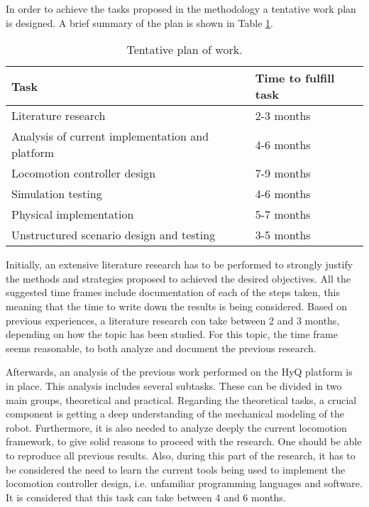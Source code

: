 \documentclass[main.tex]{subfiles}
\begin{document}
	In order to achieve the tasks proposed in the methodology a tentative work plan is designed. A brief summary of the plan is shown in Table \ref{tab:Planning}.
	
	\begin{table}[H]
		\caption{Tentative plan of work.}
		\centering
		\begin{tabular}{|l|l|}
			\hline
			Task &Time to fulfill task\\ \hline
			Literature research & 2-3 months\\ 
			Analysis of current implementation and platform  & 4-6 months\\ 
			Locomotion controller design & 7-9 months\\ 
			Simulation testing & 4-6 months\\ 
			Physical implementation & 5-7 months\\
			Unstructured scenario design and testing & 3-5 months\\
			\hline
		\end{tabular}
		\label{tab:Planning}
	\end{table}
	
	Initially, an extensive literature research has to be performed to strongly justify the methods and strategies proposed to achieved the desired objectives. All the suggested time frames include documentation of each of the steps taken, this meaning that the time to write down the results is being considered. Based on previous experiences, a literature research con take between 2 and 3 months, depending on how the topic has been studied. For this topic, the time frame seems reasonable, to both analyze and document the previous research. 
	
	Afterwards, an analysis of the previous work performed on the HyQ platform is in place. This analysis includes several subtasks. These can be divided in two main groups, theoretical and practical. Regarding the theoretical tasks, a crucial component is getting a deep understanding of the mechanical modeling of the robot. Furthermore, it is also needed to analyze deeply the current locomotion framework, to give solid reasons to proceed with the research. One should be able to reproduce all previous results. Also, during this part of the research, it has to be considered the need to learn the current tools being used to implement the locomotion controller design, i.e. unfamiliar programming languages and software. It is considered that this task can take between 4 and 6 months.
	
\end{document}
